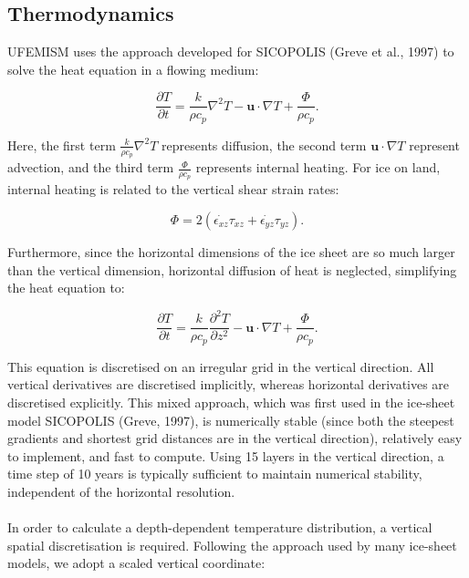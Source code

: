 \documentclass{article}
\begin{document}
\subsection{Thermodynamics}

UFEMISM uses the approach developed for SICOPOLIS (Greve et al., 1997) to solve the heat equation in a flowing medium:

\begin{equation}
\frac{\partial T}{\partial t} = \frac{k}{\rho c_p} \nabla^2 T - \mathbf{u} \cdot \nabla T + \frac{\Phi}{\rho c_p}.
\end{equation}

Here, the first term $\frac{k}{\rho c_p} \nabla^2 T$ represents diffusion, the second term $\mathbf{u} \cdot \nabla T$ represent advection, and the third term $\frac{\Phi}{\rho c_p}$ represents internal heating. For ice on land, internal heating is related to the vertical shear strain rates:

\begin{equation}
\Phi = 2 \left( \dot{\epsilon_{xz}} \tau_{xz} + \dot{\epsilon_{yz}} \tau_{yz} \right).
\end{equation}

Furthermore, since the horizontal dimensions of the ice sheet are so much larger than the vertical dimension, horizontal diffusion of heat is neglected, simplifying the heat equation to:

\begin{equation}
\frac{\partial T}{\partial t} = \frac{k}{\rho c_p} \frac{\partial^2 T}{\partial z^2} - \mathbf{u} \cdot \nabla T + \frac{\Phi}{\rho c_p}.
\end{equation}

This equation is discretised on an irregular grid in the vertical direction. All vertical derivatives are discretised implicitly, whereas horizontal derivatives are discretised explicitly. This mixed approach, which was first used in the ice-sheet model SICOPOLIS (Greve, 1997), is numerically stable (since both the steepest gradients and shortest grid distances are in the vertical direction), relatively easy to implement, and fast to compute. Using 15 layers in the vertical direction, a time step of 10 years is typically sufficient to maintain numerical stability, independent of the horizontal resolution.\\
\\
In order to calculate a depth-dependent temperature distribution, a vertical spatial discretisation is required. Following the approach used by many ice-sheet models, we adopt a scaled vertical coordinate:
\end{document}
